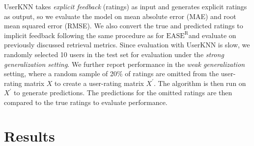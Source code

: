 \documentclass{article}
\newcommand{\easer}{$\text{EASE}^\text{R}$}
\newcommand{\userknn}{UserKNN\xspace}
\begin{document}
\userknn takes {\em explicit feedback} (ratings) as input and generates
explicit ratings as output,
so we evaluate the model on mean absolute error (MAE) and root mean squared
error (RMSE).
We also convert the true and predicted ratings to implicit feedback following
 the same procedure as for \easer and evaluate on previously discussed retrieval
 metrics.
Since evaluation with \userknn is slow, we randomly selected 10 users in the
 test set for evaluation under the {\em strong generalization setting}.
We further report performance in the {\em weak generalization} setting, where a
 random sample of 20\% of ratings are omitted from the user-rating matrix $X$ to
 create a user-rating matrix $X^{\prime}$.
The algorithm is then run on $X^{\prime}$ to generate predictions.
The predictions for the omitted ratings are then compared to the true ratings
 to evaluate performance.

\section{Results}
\end{document}
